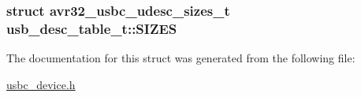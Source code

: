 \label{structusb__desc__table__t_ab8b9283572e5ec57f77e303040f50a5b}
\hypertarget{structusb__desc__table__t_a398c066ef26d68b2e4e7c699713d3aa3}{
\subsubsection[{\-S\-I\-Z\-E\-S}]{\setlength{\rightskip}{0pt plus 5cm}struct {\bf avr32\-\_\-usbc\-\_\-udesc\-\_\-sizes\-\_\-t} {\bf usb\-\_\-desc\-\_\-table\-\_\-t\-::\-S\-I\-Z\-E\-S}}}
\label{structusb__desc__table__t_a398c066ef26d68b2e4e7c699713d3aa3}


\-The documentation for this struct was generated from the following file\-:\begin{DoxyCompactItemize}
\item 
\hyperlink{usbc__device_8h}{usbc\-\_\-device.\-h}\end{DoxyCompactItemize}
